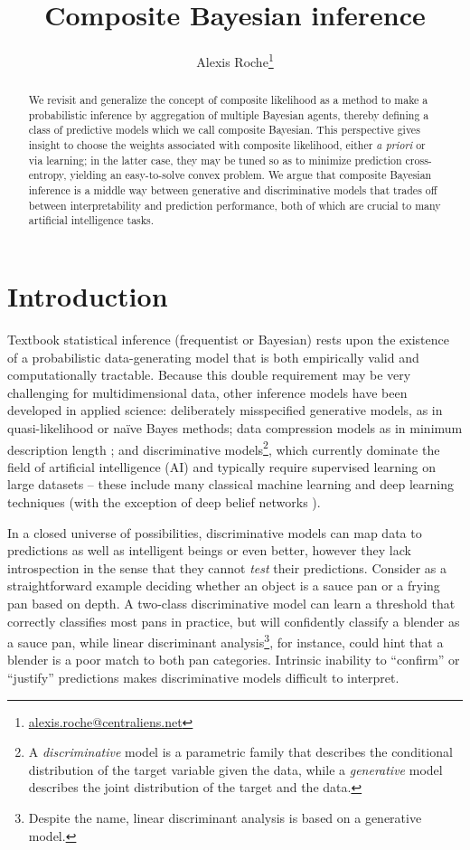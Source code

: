 \documentclass[english]{scrartcl}
\title{Composite Bayesian inference}
\author{Alexis Roche\thanks{\url{alexis.roche@centraliens.net}}}
\begin{document}
\maketitle

\begin{abstract}
We revisit and generalize the concept of composite likelihood as a method to make a probabilistic inference by aggregation of multiple Bayesian agents, thereby defining a class of predictive models which we call composite Bayesian. This perspective gives insight to choose the weights associated with composite likelihood, either {\em a priori} or via learning; in the latter case, they may be tuned so as to minimize prediction cross-entropy, yielding an easy-to-solve convex problem. We argue that composite Bayesian inference is a middle way between generative and discriminative models that trades off between interpretability and prediction performance, both of which are crucial to many artificial intelligence tasks.
\end{abstract}


\section{Introduction}
\label{sec:intro}

Textbook statistical inference (frequentist or Bayesian) rests upon the existence of a probabilistic data-generating model that is both empirically valid and computationally tractable. Because this double requirement may be very challenging for multidimensional data, other inference models have been developed in applied science: deliberately misspecified generative models, as in quasi-likelihood \cite{White-82,Walker-13} or na\"ive Bayes \cite{Ng-01} methods; data compression models as in minimum description length \cite{Grunwald-07}; and discriminative models\footnote{A {\em discriminative} model is a parametric family that describes the conditional distribution of the target variable given the data, while a {\em generative} model describes the joint distribution of the target and the data.}, which currently dominate the field of artificial intelligence (AI) and typically require supervised learning on large datasets -- these include many classical machine learning \cite{Ho-95,BergerA-96,Vapnik-00,Rasmussen-06} and deep learning \cite{Lecun-15,Goodfellow-16} techniques (with the exception of deep belief networks \cite{Hinton-06}).

In a closed universe of possibilities, discriminative models can map data to predictions as well as intelligent beings or even better, however they lack introspection in the sense that they cannot {\em test} their predictions. Consider as a straightforward example deciding whether an object is a sauce pan or a frying pan based on depth. A two-class discriminative model can learn a threshold that correctly classifies most pans in practice, but will confidently classify a blender as a sauce pan, while linear discriminant analysis\footnote{Despite the name, linear discriminant analysis is based on a generative model.}, for instance, could hint that a blender is a poor match to both pan categories. Intrinsic inability to ``confirm'' or ``justify'' predictions makes discriminative models difficult to interpret.
\end{document}
